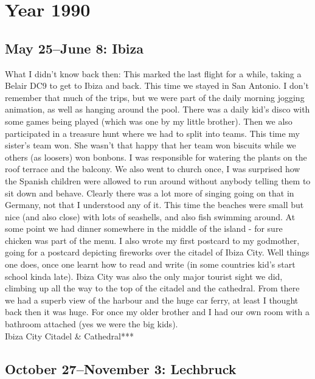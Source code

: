 \chapter{Year 1990}
\label{1990}

\section{May 25--June 8: Ibiza}
\label{1990:Ibiza}

What I didn't know back then: This marked the last flight for a while, taking a Belair DC9 to get to Ibiza and back. This time we stayed in San Antonio. I don't remember that much of the trips, but we were part of the daily morning jogging animation, as well as hanging around the pool. There was a daily kid's disco with some games being played (which was one by my little brother). Then we also participated in a treasure hunt where we had to split into teams. This time my sister's team won. She wasn't that happy that her team won biscuits while we others (as loosers) won bonbons. I was responsible for watering the plants on the roof terrace and the balcony. We also went to church once, I was surprised how the Spanish children were allowed to run around without anybody telling them to sit down and behave. Clearly there was a lot more of singing going on that in Germany, not that I understood any of it. This time the beaches were small but nice (and also close) with lots of seashells, and also fish swimming around. At some point we had dinner somewhere in the middle of the island - for sure chicken was part of the menu. I also wrote my first postcard to my godmother, going for a postcard depicting fireworks over the citadel of Ibiza City. Well things one does, once one learnt how to read and write (in some countries kid's start school kinda late). Ibiza City was also the only major tourist sight we did, climbing up all the way to the top of the citadel and the cathedral. From there we had a superb view of the harbour and the huge car ferry, at least I thought back then it was huge. For once my older brother and I had our own room with a bathroom attached (yes we were the big kids).\\

Ibiza City Citadel \& Cathedral***


\section{October 27--November 3: Lechbruck}
\label{1990: Lechbruck}

